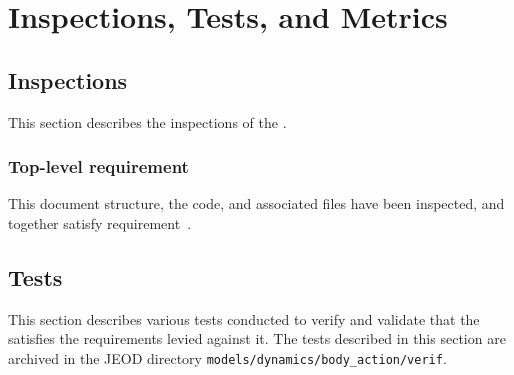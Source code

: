 \chapter{Inspections, Tests, and Metrics}\label{ch:ivv}
\section{Inspections}\label{sec:inspect}
This section describes the inspections of the \ModelDesc.

\subsection{Top-level requirement}
\label{inspect:jeod}
 This document structure, the code, and associated files have been inspected,
 and together satisfy requirement~.

\section{Tests}
This section describes various tests conducted to verify and validate
that the \ModelDesc satisfies the requirements levied against it.
The tests described in this section
are archived in the JEOD directory \verb+models/dynamics/body_action/verif+.



\newpage
\boilerplatetraceability
%

\newpage
\boilerplatemetrics
